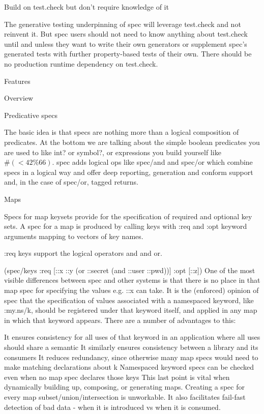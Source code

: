 Build on test.check but don’t require knowledge of it

The generative testing underpinning of spec will leverage test.check and not reinvent it. But spec users should not need to know anything about test.check until and unless they want to write their own generators or supplement spec's generated tests with further property-based tests of their own. There should be no production runtime dependency on test.check.

Features

Overview

Predicative specs

The basic idea is that specs are nothing more than a logical composition of
predicates. At the bottom we are talking about the simple boolean predicates you
are used to like int? or symbol?, or expressions you build yourself like $\#(<
42 \% 66)$. spec adds logical ops like spec/and and spec/or which combine specs in a logical way and offer deep reporting, generation and conform support and, in the case of spec/or, tagged returns.

Maps

Specs for map keysets provide for the specification of required and optional key sets. A spec for a map is produced by calling keys with :req and :opt keyword arguments mapping to vectors of key names.

:req keys support the logical operators and and or.

(spec/keys :req [::x ::y (or ::secret (and ::user ::pwd))] :opt [::z])
One of the most visible differences between spec and other systems is that there is no place in that map spec for specifying the values e.g. ::x can take. It is the (enforced) opinion of spec that the specification of values associated with a namespaced keyword, like :my.ns/k, should be registered under that keyword itself, and applied in any map in which that keyword appears. There are a number of advantages to this:

It ensures consistency for all uses of that keyword in an application where all uses should share a semantic
It similarly ensures consistency between a library and its consumers
It reduces redundancy, since otherwise many map specs would need to make matching declarations about k
Namespaced keyword specs can be checked even when no map spec declares those keys
This last point is vital when dynamically building up, composing, or generating maps. Creating a spec for every map subset/union/intersection is unworkable. It also facilitates fail-fast detection of bad data - when it is introduced vs when it is consumed.


